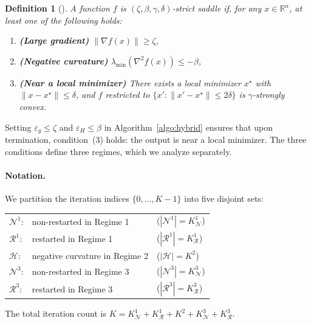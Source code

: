 \documentclass{article}
\newtheorem{definition}{Definition}
\begin{document}
\begin{definition}[\cite{GeSaddle15}]
\label{def:strict_saddle}
A function $f$ is $(\zeta, \beta, \gamma, \delta)$-strict saddle if, for any $x \in \mathbb{R}^n$, at least one of the following holds:
\begin{enumerate}
    \item \textbf{(Large gradient)} $\|\nabla f(x)\| \geq \zeta$,
    \item \textbf{(Negative curvature)} $\lambda_{\min}(\nabla^2 f(x)) \leq -\beta$,
    \item \textbf{(Near a local minimizer)} There exists a local minimizer $x^\star$ with $\|x - x^\star\| \leq \delta$, and $f$ restricted to $\{x' : \|x' - x^\star\| \leq 2\delta\}$ is $\gamma$-strongly convex.
\end{enumerate}
\end{definition}

Setting $\varepsilon_g \leq \zeta$ and $\varepsilon_H \leq \beta$ in Algorithm~\ref{algo:hybrid} ensures that upon termination, condition~(3) holds: the output is near a local minimizer. The three conditions define three regimes, which we analyze separately.

\paragraph{Notation.} We partition the iteration indices $\{0, \ldots, K-1\}$ into five disjoint sets:
\begin{center}
\begin{tabular}{lll}
$\mathcal{N}^1$: & non-restarted in Regime 1 & ($|\mathcal{N}^1| = K^1_{\mathcal{N}}$) \\
$\mathcal{R}^1$: & restarted in Regime 1 & ($|\mathcal{R}^1| = K^1_{\mathcal{R}}$) \\
$\mathcal{H}$: & negative curvature in Regime 2 & ($|\mathcal{H}| = K^2$) \\
$\mathcal{N}^3$: & non-restarted in Regime 3 & ($|\mathcal{N}^3| = K^3_{\mathcal{N}}$) \\
$\mathcal{R}^3$: & restarted in Regime 3 & ($|\mathcal{R}^3| = K^3_{\mathcal{R}}$)
\end{tabular}
\end{center}
The total iteration count is $K = K^1_{\mathcal{N}} + K^1_{\mathcal{R}} + K^2 + K^3_{\mathcal{N}} + K^3_{\mathcal{R}}$.
\end{document}
